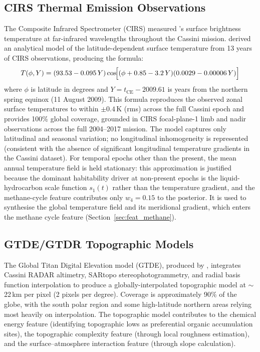 \subsection{CIRS Thermal Emission Observations}
\label{sec:cirs_data}

The Composite Infrared Spectrometer (CIRS) measured \titan{}'s surface
brightness temperature at far-infrared wavelengths throughout the Cassini
mission.  \citet{Jennings2019} derived an analytical model of the
latitude-dependent surface temperature from 13 years of CIRS observations,
producing the formula:
\begin{equation}
  T(\phi, Y) = (93.53 - 0.095\,Y)\cos\!\Bigl[
    (\phi + 0.85 - 3.2\,Y)(0.0029 - 0.00006\,Y)
  \Bigr]
  \label{eq:jennings}
\end{equation}
where $\phi$ is latitude in degrees and $Y = t_\text{CE} - 2009.61$ is years
from the northern spring equinox (11 August 2009).  This formula reproduces the
observed zonal surface temperatures to within $\pm0.4$\,K (rms) across the
full Cassini epoch and provides 100\% global coverage, grounded in CIRS
focal-plane-1 limb and nadir observations across the full 2004--2017 mission.
The model captures only latitudinal and seasonal variation; no longitudinal
inhomogeneity is represented (consistent with the absence of significant
longitudinal temperature gradients in the Cassini dataset).  For temporal
epochs other than the present, the mean annual temperature field is held
stationary: this approximation is justified because the dominant habitability
driver at non-present epochs is the liquid-hydrocarbon scale function
$s_1(t)$ rather than the temperature gradient, and the methane-cycle
feature contributes only $w_4 = 0.15$ to the posterior.  It is used to
synthesise the global temperature field and its meridional gradient, which
enters the methane cycle feature (Section~\ref{sec:feat_methane}).

\subsection{GTDE/GTDR Topographic Models}
\label{sec:topography_data}

The Global Titan Digital Elevation model (GTDE), produced by
\citet{Corlies2017Titan}, integrates Cassini RADAR altimetry, SARtopo
stereophotogrammetry, and radial basis function interpolation to produce
a globally-interpolated topographic model at $\sim$22\,km per pixel (2 pixels
per degree).  Coverage is approximately 90\% of the globe, with the south
polar region and some high-latitude northern areas relying most heavily on
interpolation.  The topographic model contributes to the chemical energy
feature (identifying topographic lows as preferential organic accumulation
sites), the topographic complexity feature (through local roughness estimation),
and the surface--atmosphere interaction feature (through slope calculation).

